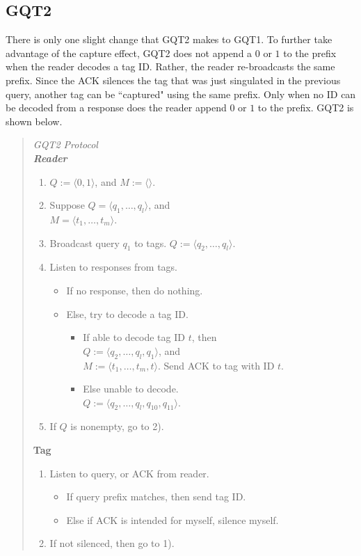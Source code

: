 \documentclass[conference]{IEEEtran}
\begin{document}
\subsection{GQT2}
There is only one slight change that GQT2 makes to GQT1.  To further take advantage of the capture effect, GQT2 does not append a $0$ or $1$ to the prefix when the reader decodes a tag ID.  Rather, the reader re-broadcasts the same prefix.  Since the ACK silences the tag that was just singulated in the previous query, another tag can be ``captured" using the same prefix.  Only when no ID can be decoded from a response does the reader append $0$ or $1$ to the prefix.  GQT2 is shown below.
\begin{quote}
\begin{footnotesize}
\em GQT2 Protocol \em \\
\textbf{Reader}
\begin{enumerate}
\item $Q:=\langle0,1\rangle$, and $M:=\langle \rangle$.
\item Suppose $Q = \langle q_1, \ldots, q_l \rangle$, and \\$M = \langle t_1, \ldots, t_m\rangle$.
\item Broadcast query $q_1$ to tags.   $Q := \langle q_2, \ldots, q_l \rangle$.
\item Listen to responses from tags.
\begin{itemize}
\item If no response, then do nothing.
\item Else, try to decode a tag ID.

\begin{itemize}
\item If able to decode tag ID $t$, then \\$Q := \langle q_2, \ldots, q_l, q_1 \rangle$, and \\$M := \langle t_1, \ldots, t_m, t\rangle$. Send ACK to tag with ID $t$.
\item Else unable to decode.  \\$Q := \langle q_2, \ldots, q_l, q_10, q_11 \rangle$.
\end{itemize}

\end{itemize}
\item If $Q$ is nonempty, go to 2).
\end{enumerate}
\textbf{Tag}
\begin{enumerate}
\item Listen to query, or ACK from reader.
\begin{itemize}
\item If query prefix matches, then send tag ID.
\item Else if ACK is intended for myself, silence myself.
\end{itemize}
\item If not silenced, then go to 1).
\end{enumerate}
\end{footnotesize}
\end{quote}
\end{document}
